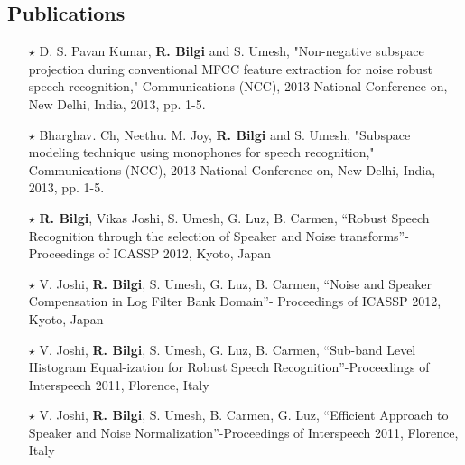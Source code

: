 \documentclass[line,margin]{res}
\begin{document}
\begin{resume}
\section{Publications}
\label{pub}
\small
 \begin{itemize}
   \item[$\star$] D. S. Pavan Kumar, {\bf R. Bilgi} and S. Umesh, "Non-negative subspace projection during conventional MFCC feature extraction for noise robust speech recognition," Communications (NCC), 2013 National Conference on, New Delhi, India, 2013, pp. 1-5.
   \item[$\star$] Bharghav. Ch, Neethu. M. Joy, {\bf R. Bilgi} and S. Umesh, "Subspace modeling technique using monophones for speech recognition," Communications (NCC), 2013 National Conference on, New Delhi, India, 2013, pp. 1-5.
   \item[$\star$] {\bf R. Bilgi}, Vikas Joshi, S. Umesh, G. Luz, B. Carmen, “Robust Speech Recognition through the selection of Speaker and Noise transforms”- Proceedings of ICASSP 2012, Kyoto, Japan
   \item[$\star$] V. Joshi, {\bf R. Bilgi}, S. Umesh, G. Luz, B. Carmen, “Noise and Speaker Compensation in Log Filter Bank Domain”- Proceedings of ICASSP 2012, Kyoto, Japan
   \item[$\star$] V. Joshi, {\bf R. Bilgi}, S. Umesh, G. Luz, B. Carmen, “Sub-band Level Histogram Equal-ization for Robust Speech Recognition”-Proceedings of Interspeech 2011, Florence, Italy
   \item[$\star$] V. Joshi, {\bf R. Bilgi}, S. Umesh, B. Carmen, G. Luz, “Efficient Approach to Speaker and Noise Normalization”-Proceedings of Interspeech 2011, Florence, Italy

\end{itemize}
 


 
\normalsize
%   
%  
%  


\end{resume}
\end{document}
